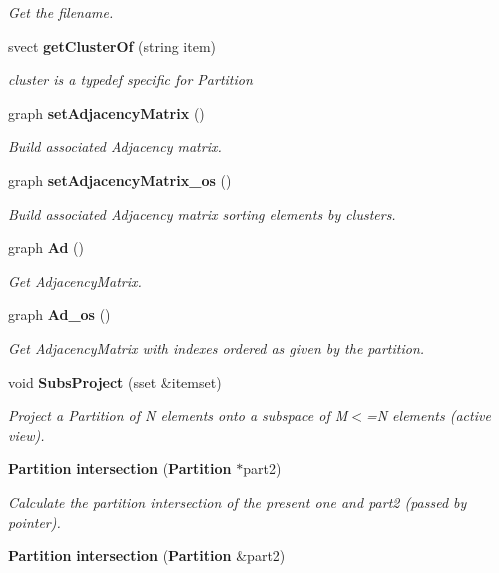 \begin{CompactItemize}
\begin{CompactList}\small\item\em Get the filename. \item\end{CompactList}\item 
svect {\bf get\-Cluster\-Of} (string item)\label{classPartition_a48}

\begin{CompactList}\small\item\em cluster is a typedef specific for Partition \item\end{CompactList}\item 
graph {\bf set\-Adjacency\-Matrix} ()\label{classPartition_a49}

\begin{CompactList}\small\item\em Build associated Adjacency matrix. \item\end{CompactList}\item 
graph {\bf set\-Adjacency\-Matrix\_\-os} ()\label{classPartition_a50}

\begin{CompactList}\small\item\em Build associated Adjacency matrix sorting elements by clusters. \item\end{CompactList}\item 
graph {\bf Ad} ()\label{classPartition_a51}

\begin{CompactList}\small\item\em Get Adjacency\-Matrix. \item\end{CompactList}\item 
graph {\bf Ad\_\-os} ()\label{classPartition_a52}

\begin{CompactList}\small\item\em Get Adjacency\-Matrix with indexes ordered as given by the partition. \item\end{CompactList}\item 
void {\bf Subs\-Project} (sset \&itemset)\label{classPartition_a53}

\begin{CompactList}\small\item\em Project a Partition of N elements onto a subspace of M$<$=N elements (active view). \item\end{CompactList}\item 
{\bf Partition} {\bf intersection} ({\bf Partition} $\ast$part2)
\begin{CompactList}\small\item\em Calculate the partition intersection of the present one and part2 (passed by pointer). \item\end{CompactList}\item 
{\bf Partition} {\bf intersection} ({\bf Partition} \&part2)\label{classPartition_a55}


\end{CompactItemize}
